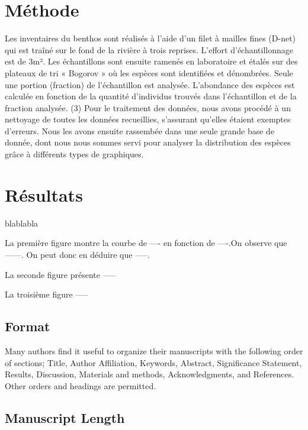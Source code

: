 \documentclass[9pt,twocolumn,twoside,]{pnas-new}
\begin{document}
\hypertarget{muxe9thode}{%
\section*{Méthode}\label{muxe9thode}}

Les inventaires du benthos sont réalisés à l'aide d'un filet à mailles
fines (D-net) qui est traîné sur le fond de la rivière à trois reprises.
L'effort d'échantillonnage est de 3m². Les échantillons sont ensuite
ramenés en laboratoire et étalés sur des plateaux de tri « Bogorov » où
les espèces sont identifiées et dénombrées. Seule une portion (fraction)
de l'échantillon est analysée. L'abondance des espèces est calculée en
fonction de la quantité d'individus trouvés dans l'échantillon et de la
fraction analysée. (3) Pour le traitement des données, nous avons
procédé à un nettoyage de toutes les données recueillies, s'assurant
qu'elles étaient exemptes d'erreurs. Nous les avons ensuite rassembée
dans une seule grande base de donnée, dont nous nous sommes servi pour
analyser la distribution des espèces grâce à différents types de
graphiques.

\hypertarget{ruxe9sultats}{%
\section*{Résultats}\label{ruxe9sultats}}

blablabla

La première figure montre la courbe de ---- en fonction de ----.On
observe que ------. On peut donc en déduire que -----.

La seconde figure présente -----

La troisième figure -----

\hypertarget{format}{%
\subsection*{Format}\label{format}}

Many authors find it useful to organize their manuscripts with the
following order of sections; Title, Author Affiliation, Keywords,
Abstract, Significance Statement, Results, Discussion, Materials and
methods, Acknowledgments, and References. Other orders and headings are
permitted.

\hypertarget{manuscript-length}{%
\subsection*{Manuscript Length}\label{manuscript-length}}
\end{document}
